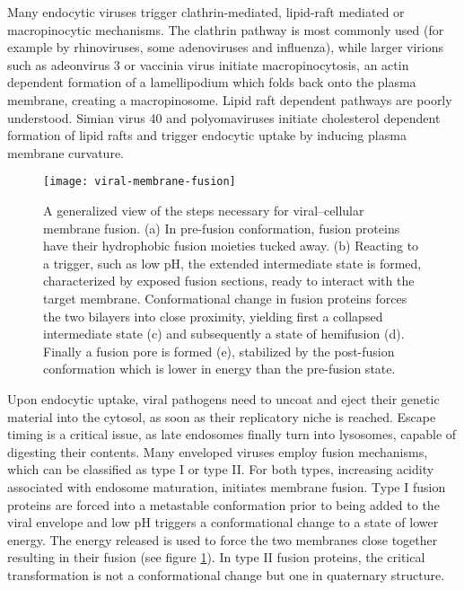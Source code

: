 Many endocytic viruses trigger clathrin-mediated, lipid-raft mediated or ma\-cro\-pi\-no\-cy\-tic mechanisms. The clathrin pathway is most commonly used (for example by rhinoviruses, some adenoviruses and influenza), while larger virions such as adeonvirus 3 or vaccinia virus initiate macropinocytosis, an actin dependent formation of a lamellipodium which folds back onto the plasma membrane, creating a macropinosome. Lipid raft dependent pathways are poorly understood. Simian virus 40 and polyomaviruses initiate cholesterol dependent formation of lipid rafts and trigger endocytic uptake by inducing plasma membrane curvature.

\begin{figure}
  \centering
  \texttt{[image: viral-membrane-fusion]}
  \caption[A generalized view of the steps necessary for viral--cellular membrane fusion]{A generalized view of the steps necessary for viral--cellular membrane fusion. (a) In pre-fusion conformation, fusion proteins have their hydrophobic fusion moieties tucked away. (b) Reacting to a trigger, such as low pH, the extended intermediate state is formed, characterized by exposed fusion sections, ready to interact with the target membrane. Conformational change in fusion proteins forces the two bilayers into close proximity, yielding first a collapsed intermediate state (c) and subsequently a state of hemifusion (d). Finally a fusion pore is formed (e), stabilized by the post-fusion conformation which is lower in energy than the pre-fusion state. \citep{Harrison2008}}
  \label{fig:viral-membrane-fusion}
\end{figure}

Upon endocytic uptake, viral pathogens need to uncoat and eject their genetic material into the cytosol, as soon as their replicatory niche is reached. Escape timing is a critical issue, as late endosomes finally turn into lysosomes, capable of digesting their contents. Many enveloped viruses employ fusion mechanisms, which can be classified as type I or type II. For both types, increasing acidity associated with endosome maturation, initiates membrane fusion. Type I fusion proteins are forced into a metastable conformation prior to being added to the viral envelope and low pH triggers a conformational change to a state of lower energy. The energy released is used to force the two membranes close together resulting in their fusion (see figure \ref{fig:viral-membrane-fusion}). In type II fusion proteins, the critical transformation is not a conformational change but one in quaternary structure.

